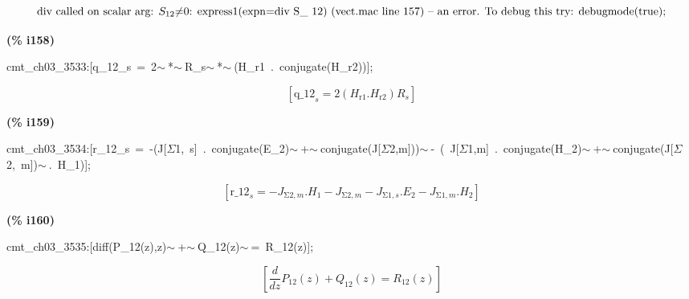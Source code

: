 \documentclass[fleqn]{article}
\begin{document}
\[\displaystyle \mbox{}\\\mbox{%
div called on scalar arg: }{S_{\ensuremath{\mathrm{12}}}}\mbox{%
\ensuremath{\neq}0: express1(expn=div S\_ 12) (vect.mac line 157)
}\mbox{%
 -- an error. To debug this try: debugmode(true);}\mbox{}
\]


\noindent
\begin{minipage}[t]{4.000000em}\color{red}\bfseries
(\% i158)	
\end{minipage}
\begin{minipage}[t]{\textwidth}\color{blue}
cmt\_ch03\_3533:[q\_12\_s\ =\ 2\ensuremath{\sim\ }*\ensuremath{\sim\ }R\_s\ensuremath{\sim\ }*\ensuremath{\sim\ }(H\_r1\ .\ conjugate(H\_r2))];
\end{minipage}
\[\displaystyle \tag{cmt\_ ch03\_ 3533} 
\left[ {{\ensuremath{\mathrm{q\_ 12}}}_s}=2 \left( {H_{\ensuremath{\mathrm{r1}}}}\ensuremath{\mathrm{ . }}{H_{\ensuremath{\mathrm{r2}}}}\right)  {R_s}\right] \mbox{}
\]


\noindent
\begin{minipage}[t]{4.000000em}\color{red}\bfseries
(\% i159)	
\end{minipage}
\begin{minipage}[t]{\textwidth}\color{blue}
cmt\_ch03\_3534:[r\_12\_s\ =\ -(J[\ensuremath{\Sigma}1,\ s]\ .\ conjugate(E\_2)\ensuremath{\sim\ }+\ensuremath{\sim\ }conjugate(J[\ensuremath{\Sigma}2,m]))\ensuremath{\sim\ }-\ (\ J[\ensuremath{\Sigma}1,m]\ .\ conjugate(H\_2)\ensuremath{\sim\ }+\ensuremath{\sim\ }conjugate(J[\ensuremath{\Sigma}2,\ m])\ensuremath{\sim\ }.\ H\_1)];
\end{minipage}
\[\displaystyle \tag{cmt\_ ch03\_ 3534} 
\left[ {{\ensuremath{\mathrm{r\_ 12}}}_s}=-{J_{\ensuremath{\mathrm{\Sigma 2}},m}}\ensuremath{\mathrm{ . }}{H_1}-{J_{\ensuremath{\mathrm{\Sigma 2}},m}}-{J_{\ensuremath{\mathrm{\Sigma 1}},s}}\ensuremath{\mathrm{ . }}{E_2}-{J_{\ensuremath{\mathrm{\Sigma 1}},m}}\ensuremath{\mathrm{ . }}{H_2}\right] \mbox{}
\]


\noindent
\begin{minipage}[t]{4.000000em}\color{red}\bfseries
(\% i160)	
\end{minipage}
\begin{minipage}[t]{\textwidth}\color{blue}
cmt\_ch03\_3535:[diff(P\_12(z),z)\ensuremath{\sim\ }+\ensuremath{\sim\ }Q\_12(z)\ensuremath{\sim\ }=\ R\_12(z)];
\end{minipage}
\[\displaystyle \tag{cmt\_ ch03\_ 3535} 
\left[ \frac{d}{d z} {P_{\ensuremath{\mathrm{12}}}}(z)+{Q_{\ensuremath{\mathrm{12}}}}(z)={R_{\ensuremath{\mathrm{12}}}}(z)\right] \mbox{}
\]
\end{document}
